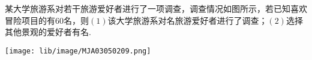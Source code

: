 某大学旅游系对若干旅游爱好者进行了一项调查，调查情况如图所示，若已知喜欢冒险项目的有$60$名，则$(1)$该大学旅游系对\key{}名旅游爱好者进行了调查；$(2)$选择其他景观的爱好者有\key{}名.
\begin{center}
    \texttt{[image: lib/image/MJA03050209.png]}
\end{center}